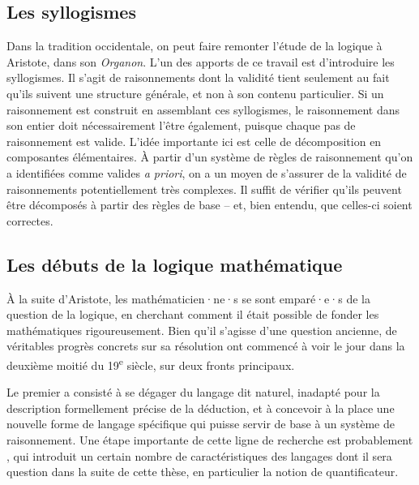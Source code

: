 \subsection{Les syllogismes}
Dans la tradition occidentale, on peut faire remonter l’étude de
la logique à Aristote, dans son \textit{Organon}.
L’un des apports de ce travail est d’introduire les syllogismes.
Il s’agit de raisonnements dont la validité tient seulement au fait qu’ils
suivent une structure générale, et non à son contenu particulier.
Si un raisonnement est construit en assemblant ces syllogismes,
le raisonnement dans son entier doit nécessairement l’être également, puisque
chaque pas de raisonnement est valide.
L’idée importante ici est celle de décomposition en composantes élémentaires. À
partir d’un système de règles de raisonnement qu’on a identifiées comme valides 
\textit{a priori},
on a un moyen de s’assurer de la validité de raisonnements potentiellement
très complexes.
Il suffit de vérifier qu’ils peuvent être décomposés à partir
des règles de base – et, bien entendu, que celles-ci soient correctes.

\subsection{Les débuts de la logique mathématique}
À la suite d’Aristote, les mathématicien·ne·s se sont emparé·e·s de la question
de la logique, en cherchant comment il était possible de fonder les mathématiques
rigoureusement. Bien qu’il s’agisse d’une question ancienne, de véritables
progrès concrets sur sa résolution ont commencé à voir le jour dans la deuxième
moitié du 19\textsuperscript{e} siècle, sur deux fronts principaux.

Le premier a consisté à se dégager du langage dit
naturel, inadapté pour la description formellement précise de la déduction, et à
concevoir à la place une nouvelle forme de langage spécifique qui puisse servir de
base à un système de raisonnement. Une étape importante
de cette ligne de recherche est
probablement , qui introduit un certain nombre de
caractéristiques des langages dont il sera question dans la suite de cette thèse,
en particulier la notion de quantificateur.

